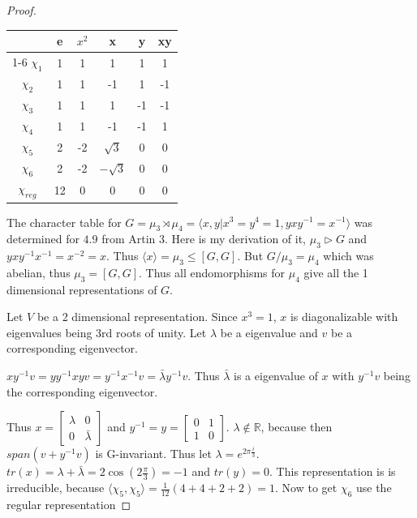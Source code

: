 \documentclass{article}
\newcommand{\R}{\mathbb{R}}
\newcommand{\angles}[1]{\langle #1 \rangle}
\begin{document}
\begin{proof}
    
    \begin{tabular}{c | c c c c c }
        & e & $x^2$ & x & y & xy  \\
        \cline{1-6}
        $\chi_1$ & 1 & 1 & 1 & 1 & 1 \\
        $\chi_2$ & 1 & 1 & -1 & 1 & -1 \\
        $\chi_3$ & 1 & 1 & 1 & -1 & -1 \\
        $\chi_4$ & 1 & 1 & -1 & -1 & 1 \\
        $\chi_5$ & 2 & -2 & $\sqrt{3}$ & 0 & 0 \\
        $\chi_6$ & 2 & -2 & $-\sqrt{3}$ & 0 & 0 \\
        $\chi_{reg}$ & 12 & 0 & 0 & 0 & 0 

    \end{tabular}
    
    \bigskip

    The character table for $G = \mu_3 \rtimes \mu_4 = \angles{x, y | x^3 = y^4 = 1, yxy^{-1} = x^{-1}}$ was determined for $4.9$ from Artin 3. Here is my derivation of it, $\mu_3 \triangleright G$ and $yxy^{-1}x^{-1} = x^{-2} = x$. Thus $\angles{x} = \mu_3 \leq [G, G]$. But $G / \mu_3 = \mu_4$ which was abelian, thus $\mu_3 = [G, G]$. Thus all endomorphisms for $\mu_4$ give all the 1 dimensional representations of $G$.
    
    
    Let $V$ be a 2 dimensional representation. Since $x^3 = 1$, $x$ is diagonalizable with eigenvalues being 3rd roots of unity. Let $\lambda$ be a eigenvalue and $v$ be a corresponding eigenvector. 
    
    
    $xy^{-1}v = y y^{-1} x y v = y^{-1} x^{-1} v = \bar{\lambda} y^{-1}v$. Thus $\bar{\lambda}$ is a eigenvalue of $x$ with $y^{-1}v$ being the corresponding eigenvector. 
    
    Thus $x = \begin{bmatrix}
        \lambda & 0 \\ 0 & \bar{\lambda}
    \end{bmatrix}$ and $y^{-1} = y = \begin{bmatrix}
        0 & 1 \\ 1 & 0
    \end{bmatrix}$. $\lambda \not \in \R$, because then $span(v + y^{-1}v)$ is G-invariant.  Thus let $\lambda  = e^{2 \pi \frac{i}{3}}$. $tr(x) = \lambda + \bar{\lambda} = 2\cos(2 \frac{\pi}{3}) = -1$ and $tr(y) = 0$. This representation is is irreducible, because $\angles{\chi_5, \chi_5} = \frac{1}{12} (4 + 4 + 2 + 2) = 1$. Now to get $\chi_6$ use the regular representation           
    

\end{proof}
\end{document}

